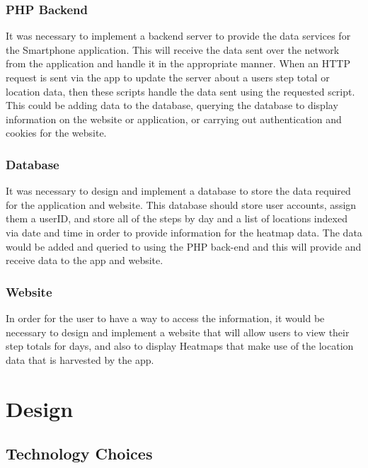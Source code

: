 \documentclass{l4proj}
\begin{document}
\subsection{PHP Backend}

It was necessary to implement a backend server to provide the data services for the Smartphone application. This will receive the data sent over the network from the application and handle it in the appropriate manner. When an HTTP request is sent via the app to update the server about a users step total or location data, then these scripts handle the data sent using the requested script. This could be adding data to the database, querying the database to display information on the website or application, or carrying out authentication and cookies for the website.

\subsection{Database}

It was necessary to design and implement a database to store the data required for the application and website. This database should store user accounts, assign them a userID, and store all of the steps by day and a list of locations indexed via date and time in order to provide information for the heatmap data. The data would be added and queried to using the PHP back-end and this will provide and receive data to the app and website.

\subsection{Website}

In order for the user to have a way to access the information, it would be necessary to design and implement a website that will allow users to view their step totals for days, and also to display Heatmaps that make use of the location data that is harvested by the app.


\chapter{Design}

\section{Technology Choices}
\end{document}

